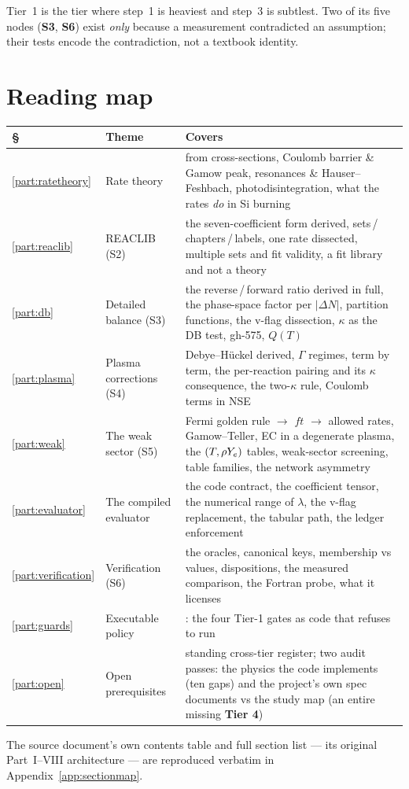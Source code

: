 Tier~1 is the tier where step~1 is heaviest and step~3 is subtlest. Two of its
five nodes (\textbf{S3}, \textbf{S6}) exist \emph{only} because a measurement
contradicted an assumption; their tests encode the contradiction, not a
textbook identity.

\section*{Reading map}
\label{sec:readingmap}

\begin{tabularx}{\textwidth}{@{}L{1.1cm} L{3.7cm} Y@{}}
\toprule
\textbf{\S} & \textbf{Theme} & \textbf{Covers} \\
\midrule
\ref{part:ratetheory} & Rate theory &
  \sigv{} from cross-sections, Coulomb barrier \& Gamow peak, resonances \&
  Hauser--Feshbach, photodisintegration, what the rates \emph{do} in Si
  burning \\
\ref{part:reaclib} & REACLIB (S2) &
  the seven-coefficient form derived, sets\,/\,chapters\,/\,labels, one rate
  dissected, multiple sets and fit validity, a fit library and not a theory \\
\ref{part:db} & Detailed balance (S3) &
  the reverse\,/\,forward ratio derived in full, the phase-space factor per
  $|\Delta N|$, partition functions, the v-flag dissection, $\kappa$ as the DB
  test, gh-575, $Q(T)$ \\
\ref{part:plasma} & Plasma corrections (S4) &
  Debye--H\"uckel derived, $\Gamma$ regimes,  term by term,
  the per-reaction pairing and its $\kappa$ consequence, the two-$\kappa$ rule,
  Coulomb terms in NSE \\
\ref{part:weak} & The weak sector (S5) &
  Fermi golden rule $\to$ $ft$ $\to$ allowed rates, Gamow--Teller, EC in a
  degenerate plasma, the $(T,\rho Y_{e})$ tables, weak-sector screening, table
  families, the network asymmetry \\
\ref{part:evaluator} & The compiled evaluator &
  the code contract, the coefficient tensor, the numerical range of $\lambda$,
  the v-flag replacement, the tabular path, the ledger enforcement \\
\ref{part:verification} & Verification (S6) &
  the oracles, canonical keys, membership vs values, dispositions, the measured
  comparison, the Fortran probe, what it licenses \\
\ref{part:guards} & Executable policy &
  : the four Tier-1 gates as code that refuses to run \\
\ref{part:open} & Open prerequisites &
  standing cross-tier register; two audit passes: the physics the code
  implements (ten gaps) and the project's own spec documents vs the study map
  (an entire missing \textbf{Tier 4}) \\
\bottomrule
\end{tabularx}

\vspace{1em}
{\small The source document's own contents table and full section list --- its
original Part~I--VIII architecture --- are reproduced verbatim in
Appendix~\ref{app:sectionmap}.}

\clearpage
\tableofcontents
\clearpage
